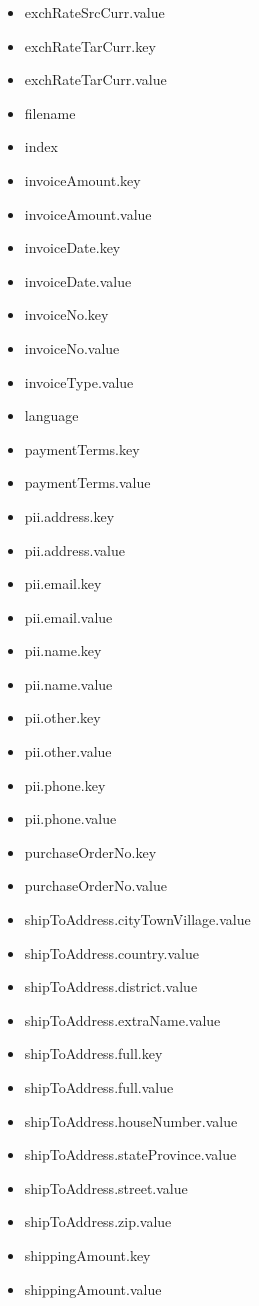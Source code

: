 \begin{multicols}{2}
\begin{itemize}
\item[] exchRateSrcCurr.value
\item[] exchRateTarCurr.key
\item[] exchRateTarCurr.value
\item[] filename
\item[] index
\item[] invoiceAmount.key
\item[] invoiceAmount.value
\item[] invoiceDate.key
\item[] invoiceDate.value
\item[] invoiceNo.key
\item[] invoiceNo.value
\item[] invoiceType.value
\item[] language
\item[] paymentTerms.key
\item[] paymentTerms.value
\item[] pii.address.key
\item[] pii.address.value
\item[] pii.email.key
\item[] pii.email.value
\item[] pii.name.key
\item[] pii.name.value
\item[] pii.other.key
\item[] pii.other.value
\item[] pii.phone.key
\item[] pii.phone.value
\item[] purchaseOrderNo.key
\item[] purchaseOrderNo.value
\item[] shipToAddress.cityTownVillage.value
\item[] shipToAddress.country.value
\item[] shipToAddress.district.value
\item[] shipToAddress.extraName.value
\item[] shipToAddress.full.key
\item[] shipToAddress.full.value
\item[] shipToAddress.houseNumber.value
\item[] shipToAddress.stateProvince.value
\item[] shipToAddress.street.value
\item[] shipToAddress.zip.value
\item[] shippingAmount.key
\item[] shippingAmount.value

\end{itemize}
\end{multicols}
